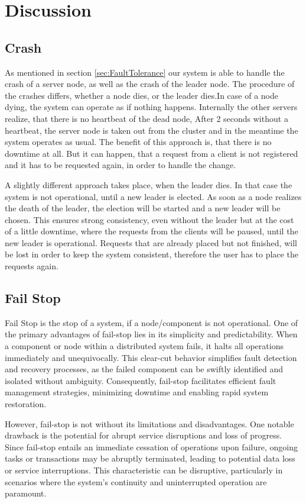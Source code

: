 \chapter{Discussion}\label{ch:Discussion}
\section{Crash}\label{sec:Crash}
As mentioned in section \ref{sec:FaultTolerance} our system is able to handle the crash of a server node, as well as the crash of the leader node. The procedure of the crashes differs, whether a node dies, or the leader dies.In case of a node dying, the system
can operate as if nothing happens. Internally the other servers realize, that there is no heartbeat of the dead node, After 2 seconds without a heartbeat, the server node is taken out from the cluster and in the meantime the system operates as usual. The benefit of this
approach is, that there is no downtime at all. But it can happen, that a request from a client is not registered and it has to be requested again, in order to handle the change.

A slightly different approach takes place, when the leader dies. In that case the system is not operational, until a new leader is elected. As soon as a node realizes the death of the leader, the election will be started and a new leader will be chosen. This
ensures strong consistency, even without the leader but at the cost of a little downtime, where the requests from the clients will be paused, until the new leader is operational. Requests that are already placed but not finished, will be lost in order
to keep the system consistent, therefore the user has to place the requests again.

\section{Fail Stop}\label{sec:Fail Stop}
Fail Stop is the stop of a system, if a node/component is not operational. One of the primary advantages of fail-stop lies in its simplicity and predictability. When a component or node within a distributed system fails, it halts all operations immediately and unequivocally. This clear-cut behavior simplifies fault detection and recovery processes, as the failed component can be swiftly identified and isolated without ambiguity. Consequently, fail-stop facilitates efficient fault management strategies, minimizing downtime and enabling rapid system restoration. 

However, fail-stop is not without its limitations and disadvantages. One notable drawback is the potential for abrupt service disruptions and loss of progress. Since fail-stop entails an immediate cessation of operations upon failure, ongoing tasks or transactions may be abruptly terminated, leading to potential data loss or service interruptions. This characteristic can be disruptive, particularly in scenarios where the system's continuity and uninterrupted operation are paramount.

